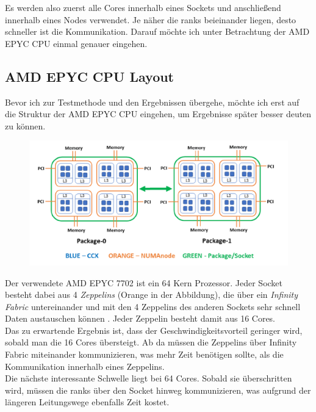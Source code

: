 \documentclass[german,plainarticle,hyperref,utf8]{zihpub}
\begin{document}
	Es werden also zuerst alle Cores innerhalb eines Sockets und anschließend innerhalb eines Nodes verwendet. Je näher die ranks beieinander liegen, desto schneller ist die Kommunikation. Darauf möchte ich unter Betrachtung der AMD EPYC CPU einmal genauer eingehen.
	
	\subsection{AMD EPYC CPU Layout} \label{cpu_layout}
	Bevor ich zur Testmethode und den Ergebnissen übergehe, möchte ich erst auf die Struktur der AMD EPYC CPU eingehen, um Ergebnisse später besser deuten zu können.\\
	
	\begin{figure}[h]
		\centering
		\includegraphics[scale=0.35]{AMD_EPYC.png}
	\end{figure}
	
	Der verwendete AMD EPYC 7702 ist ein 64 Kern Prozessor. Jeder Socket besteht dabei aus 4 \textit{Zeppelins} (Orange in der Abbildung), die über ein \textit{Infinity Fabric} untereinander und mit den 4 Zeppelins des anderen Sockets sehr schnell Daten austauschen können \cite{amd}. Jeder Zeppelin besteht damit aus 16 Cores.\\
	
	Das zu erwartende Ergebnis ist, dass der Geschwindigkeitsvorteil geringer wird, sobald man die 16 Cores übersteigt. Ab da müssen die Zeppelins über Infinity Fabric miteinander kommunizieren, was mehr Zeit benötigen sollte, als die Kommunikation innerhalb eines Zeppelins.\\
	
	Die nächste interessante Schwelle liegt bei 64 Cores. Sobald sie überschritten wird, müssen die ranks über den Socket hinweg kommunizieren, was aufgrund der längeren Leitungswege ebenfalls Zeit kostet.\\
	
\end{document}
